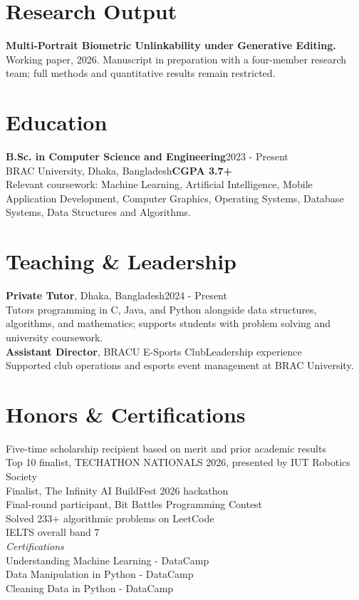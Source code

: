 \documentclass[10pt,a4paper]{article}
\begin{document}
\section{Research Output}
\textbf{Multi-Portrait Biometric Unlinkability under Generative Editing.} Working paper, 2026. Manuscript in preparation with a four-member research team; full methods and quantitative results remain restricted.

\section{Education}
\textbf{B.Sc. in Computer Science and Engineering}\hfill 2023 - Present\\
BRAC University, Dhaka, Bangladesh\hfill \textbf{CGPA 3.7+}\\
Relevant coursework: Machine Learning, Artificial Intelligence, Mobile Application Development, Computer Graphics, Operating Systems, Database Systems, Data Structures and Algorithms.

\section{Teaching \& Leadership}
\textbf{Private Tutor}, Dhaka, Bangladesh\hfill 2024 - Present\\
Tutors programming in C, Java, and Python alongside data structures, algorithms, and mathematics; supports students with problem solving and university coursework.\\[0.2em]
\textbf{Assistant Director}, BRACU E-Sports Club\hfill Leadership experience\\
Supported club operations and esports event management at BRAC University.

\section{Honors \& Certifications}
Five-time scholarship recipient based on merit and prior academic results\\
Top 10 finalist, TECHATHON NATIONALS 2026, presented by IUT Robotics Society\\
Finalist, The Infinity AI BuildFest 2026 hackathon\\
Final-round participant, Bit Battles Programming Contest\\
Solved 233+ algorithmic problems on LeetCode\\
IELTS overall band 7\\[2pt]
\textit{Certifications}\\
Understanding Machine Learning - DataCamp\\
Data Manipulation in Python - DataCamp\\
Cleaning Data in Python - DataCamp
\end{document}
